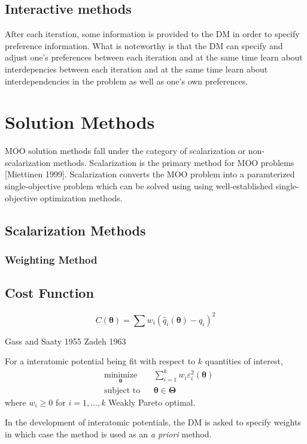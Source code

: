 \subsection{Interactive methods}
After each iteration, some information is provided to the DM in order to specify preference information.  What is noteworthy is that the DM can specify and adjust one's preferences between each iteration and at the same time learn about interdepencies between each iteration and at the same time learn about interdependencies in the problem as well as one's own preferences.
\section{Solution Methods}
MOO solution methods fall under the category of scalarization or non-scalarization methods.  Scalarization is the primary method for MOO problems [Miettinen 1999].  Scalarization converts the MOO problem into a paramterized single-objective problem which can be solved using using well-established single-objective optimization methods.
\subsection{Scalarization Methods}
\subsubsection{Weighting Method}
\subsection{Cost Function}
\begin{equation}
  C(\bm{\theta})=\sum w_i (\hat{q}_i(\bm{\theta})-q_i)^2
\end{equation}

Gass and Saaty 1955
Zadeh 1963

For a interatomic potential being fit with respect to $k$ quantities of interest,
\begin{equation}
  \begin{aligned}
  & \underset{\bm{\theta}}{\text{minimize}}
        & & \sum_{i=1}^{k}w_{i} \varepsilon_i^2(\bm{\theta}) \\
  & \text{subject to}
        & & \bm{\theta} \in \bm{\Theta}
  \end{aligned}
\end{equation}
where $w_i \geq 0$ for $i=1,...,k$
Weakly Pareto optimal.

  In the development of interatomic potentials, the DM is asked to specify weights in which case the method is used as an \emph{a priori} method.

